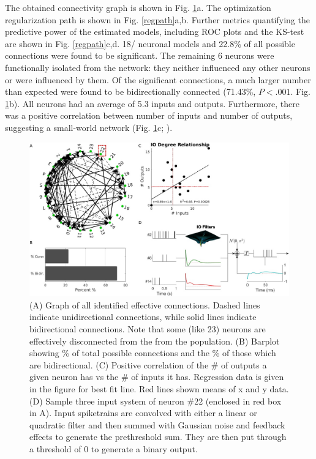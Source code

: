 \documentclass[11pt,a4paper,final]{article}
\begin{document}
The obtained connectivity graph is shown in Fig. \ref{graph}a.
The optimization regularization path is shown in Fig. \ref{regpath}a,b.
Further metrics quantifying the predictive power of the estimated models, including ROC plots and the KS-test are shown in Fig. \ref{regpath}c,d.
18/\nn{} neuronal models and 22.8\% of all possible connections were found to be significant.
The remaining 6 neurons were functionally isolated from the network: they neither influenced any other neurons or were influenced by them.
Of the significant connections, a much larger number than expected were found to be bidirectionally connected (71.43\%, $P<.001$. Fig. \ref{graph}b).
All neurons had an average of 5.3 inputs and outputs.
Furthermore, there was a positive correlation between number of inputs and number of outputs, suggesting a small-world network (Fig. \ref{graph}c; \citet{sporns09,fallani14}).

\begin{figure}[!ht]
	\centering
	\includegraphics[width=160mm]{graph}
	\caption[Graph \& Example System]{
		(A) Graph of all identified effective connections. Dashed lines indicate unidirectional connections, while solid lines indicate bidirectional connections. Note that some (like 23) neurons are effectively disconnected from the from the population.
		(B) Barplot showing \% of total possible connections and the \% of those which are bidirectional.
		(C) Positive correlation of the \# of outputs a given neuron has vs the \# of inputs it has. Regression data is given in the figure for best fit line. Red lines shown means of x and y data.
		(D) Sample three input system of neuron \#22 (enclosed in red box in A). Input spiketrains are convolved with either a linear or quadratic filter and then summed with Gaussian noise and feedback effects to generate the prethreshold sum. They are then put through a threshold of 0 to generate a binary output.}
	\label{graph}
\end{figure}
\end{document}
